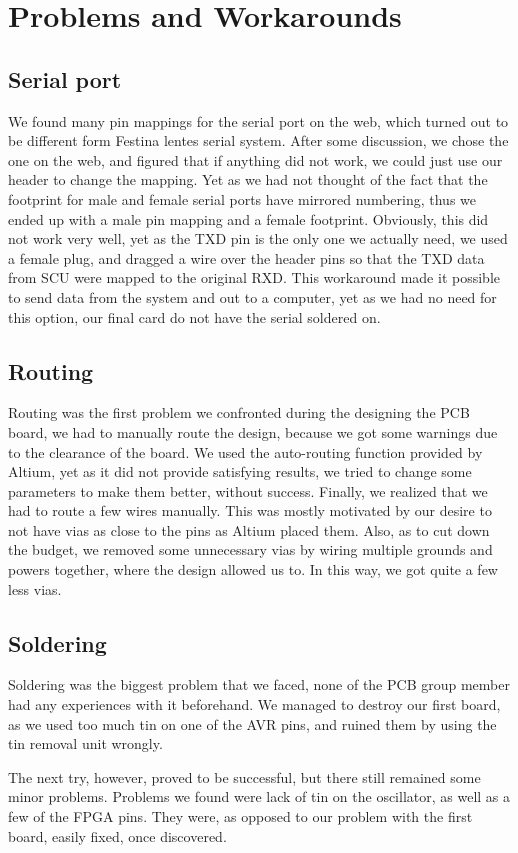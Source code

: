 \section {Problems and Workarounds}
\subsection{Serial port}
We found many pin mappings for the serial port on the web, which turned out to be
different form Festina lentes serial system. After some discussion, we chose the one on the web,
and figured that if anything did not work, we could just use our header to change the mapping.
Yet as we had not thought of the fact that the footprint for male and female serial ports have
mirrored numbering, thus we ended up with a male pin mapping and a female footprint. 
Obviously, this did not work very well, yet as the TXD pin is the only one we actually need, 
we used a female plug, and dragged a wire over the header pins so that the TXD data from SCU 
were mapped to the original RXD. This workaround made it possible to send data from the system 
and out to a computer, yet as we had no need for this option, our final card do not have the serial soldered on.
\subsection{Routing}
Routing was the first problem we confronted during the designing the \ac{PCB}
board, we had to manually route the design, because we got some warnings due to
the clearance of the board. We used the auto-routing function provided by
Altium, yet as it did not provide satisfying results, we tried to change some
parameters to make them better, without success. Finally, we realized that we
had to route a few wires manually. This was mostly motivated by our desire to
not have vias as close to the pins as Altium placed them. Also, as to cut down
the budget, we removed some unnecessary vias by wiring multiple grounds and
powers together, where the design allowed us to. In this way, we got quite a few
less vias.
\subsection{Soldering}
Soldering was the biggest problem that we faced, none of the \ac{PCB} group
member had any experiences with it beforehand. We managed to destroy our first
board, as we used too much tin on one of the AVR pins, and ruined them by using
the tin removal unit wrongly.

The next try, however, proved to be successful, but there still remained some
minor problems. Problems we found were lack of tin on the oscillator, as well as
a few of the \ac{FPGA} pins. They were, as opposed to our problem with the first
board, easily fixed, once discovered.


